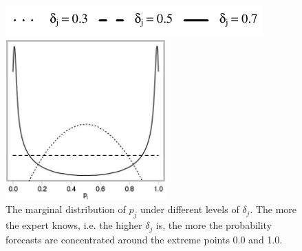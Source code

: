 \documentclass[11pt]{article}
\theoremstyle{definition}
\theoremstyle{definition}
\begin{document}
\begin{figure}[t]
\centering
	\hspace{0em}\includegraphics{LegendMarginal}

 \includegraphics[width= 0.55\textwidth]{Marginals}
   \caption{The marginal distribution of $p_j$ under different levels of $\delta_j$. The more the expert knows, i.e. the higher $\delta_j$ is, the more the probability forecasts are concentrated around the extreme points 0.0 and 1.0.}
\label{marginals}
\end{figure}
\end{document}
